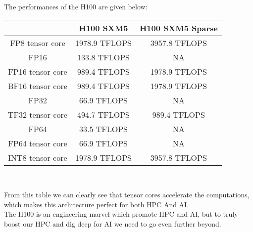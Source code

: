 \documentclass[12pt]{article}
\begin{document}
The performances of the H100 are given below:\\
\begin{center}
\begin{tabular}{c|c|c}
    \hline
    & H100 SXM5 & H100 SXM5 Sparse\\
    \hline
    FP8 tensor core & 1978.9 TFLOPS & 3957.8 TFLOPS\\
    FP16 & 133.8 TFLOPS & NA\\
    FP16 tensor core & 989.4 TFLOPS & 1978.9 TFLOPS\\
    BF16 tensor core & 989.4 TFLOPS & 1978.9 TFLOPS\\
    FP32 & 66.9 TFLOPS & NA\\
    TF32 tensor core & 494.7 TFLOPS & 989.4 TFLOPS\\
    FP64 & 33.5 TFLOPS & NA\\
    FP64 tensor core & 66.9 TFLOPS & NA\\
    INT8 tensor core & 1978.9 TFLOPS & 3957.8 TFLOPS\\
\end{tabular}\\
\end{center}
From this table we can clearly see that tensor cores accelerate the computations, which makes this architecture perfect for both HPC And AI.\\
The H100 is an engineering marvel which promote HPC and AI, but to truly boost our HPC and dig deep for AI we need to go even further beyond.
\end{document}
